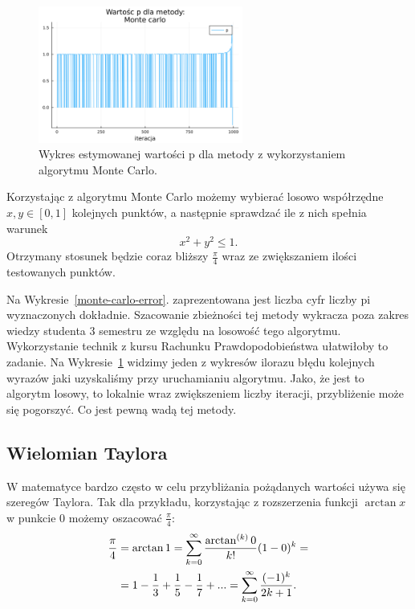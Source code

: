 \begin{figure}[!h]\centering
    \renewcommand{\figurename}{Wykres}
    \includegraphics[width=0.6\textwidth]{../prog/monte_carlo_error_ratio.png}
    \caption{Wykres estymowanej wartości p dla metody z wykorzystaniem algorytmu Monte Carlo.}
    \label{monte-carlo-convergence}
\end{figure}

Korzystając z algorytmu Monte Carlo możemy wybierać losowo współrzędne $x,y\in[0,1]$ kolejnych punktów, a następnie sprawdzać ile z nich spełnia warunek
$$x^2+y^2\leq1.$$
Otrzymany stosunek będzie coraz bliższy $\frac\pi4$ wraz ze zwiększaniem ilości testowanych punktów.

Na Wykresie~\ref{monte-carlo-error}. zaprezentowana jest liczba cyfr liczby pi wyznaczonych dokładnie. Szacowanie zbieżności tej metody wykracza poza zakres wiedzy studenta 3 semestru ze względu na losowość tego algorytmu. Wykorzystanie technik z kursu Rachunku Prawdopodobieństwa ułatwiłoby to zadanie. Na Wykresie~\ref{monte-carlo-convergence} widzimy jeden z wykresów ilorazu błędu kolejnych wyrazów jaki uzyskaliśmy przy uruchamianiu algorytmu. Jako, że jest to algorytm losowy, to lokalnie wraz zwiększeniem liczby iteracji, przybliżenie może się pogorszyć. Co jest pewną wadą tej metody.

\subsection{Wielomian Taylora}
W matematyce bardzo często w celu przybliżania pożądanych wartości używa się szeregów Taylora. Tak dla przykładu, korzystając z rozszerzenia funkcji $\arctan x$ w punkcie $0$ możemy oszacować $\frac\pi4$:
\begin{equation}
\begin{split}
    \frac\pi4&=\arctan1=\sum\limits_{k=0}^\infty{\arctan^{(k)}0\over k!}(1-0)^k=\\
    &=1-\frac13+\frac15-\frac17+...=\sum\limits_{k=0}^\infty{(-1)^k\over 2k+1}.
\end{split}
\end{equation}

